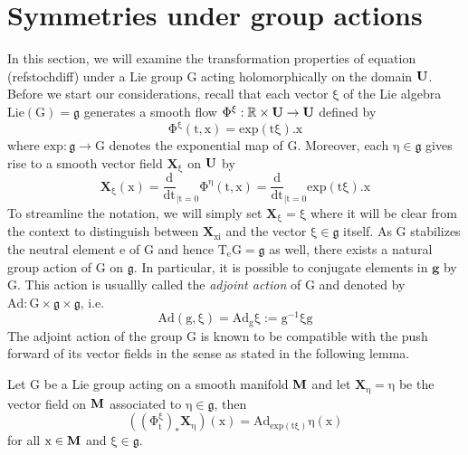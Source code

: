 \documentclass[10 pt,english]{smfart}
\newcommand{\G}{{\textrm{G}}}
\newcommand{\Xvec}{\mathrm{\mathbf{X}}}
\newcommand{\g}{\mathrm{\mathbf{g}}}
\newcommand{\U}{{\bf{U}}}
\newcommand{\M}{{\bf{M}}}
\begin{document}
\section{Symmetries under group actions}
In this section, we will examine the transformation properties of equation (ref{stochdiff}) under a Lie group $\mathrm{\G}$ acting holomorphically on the domain $\mathrm{\U}$. 
Before we start our considerations, recall that each vector $\mathrm{\xi}$ of the Lie algebra ${\mathrm{Lie}(\G)=\mathfrak{g}}$ generates a smooth flow $\mathrm{\Phi^{\xi}:\mathbb{R}\times\U\rightarrow\U}$
defined by 
\begin{equation}
\mathrm{\Phi^{\xi}(t,x)=exp(t \xi).x}
\end{equation} where $\mathrm{exp:\mathfrak{g}\rightarrow \G}$ denotes the exponential map of $\mathrm{\G}$. Moreover, each $\mathrm{\eta\in\mathfrak{g}}$ gives rise to a smooth vector field $\mathrm{\Xvec_{\xi}}$  on $\mathrm{\U}$ by 
\begin{equation}
\mathrm{\Xvec_{\xi}(x)=\frac{d}{dt}_{\vert t=0}\Phi^{\eta}(t,x)=\frac{d}{dt}_{\vert t=0}exp(t \xi).x}
\end{equation} To streamline the notation, we will simply set $\mathrm{\Xvec_{\xi}=\xi}$ where it will be clear from the context to distinguish between $\mathrm{\Xvec_{xi}}$ and the vector $\mathrm{\xi\in\mathfrak{g}}$
itself. As $\mathrm{\G}$ stabilizes the neutral element $\mathrm{e}$ of $\mathrm{\G}$ and hence $\mathrm{T_{e}\G=\mathfrak{g}}$ as well, there exists a natural group action of $\mathrm{\G}$
on $\mathrm{\mathfrak{g}}$. In particular, it is possible to conjugate elements in $\mathfrak{\g}$ by $\mathrm{\G}$. This action is usuallly called the \textit{adjoint action} of $\mathrm{\G}$ and denoted by 
$\mathrm{Ad:\G\times\mathfrak{g}\times\mathfrak{g}}$, i.e.
\begin{equation}
\mathrm{Ad(g,\xi)=Ad_{g}\xi:=g^{-1}\xi g}
\end{equation}
The adjoint action of the group $\mathrm{\G}$ is known to be compatible with the push forward of its vector fields in the sense as stated in the following lemma.
\begin{lemm}\label{adjointaction} Let $\mathrm{\G}$ be a Lie group acting on a smooth manifold $\mathrm{\M}$ and let $\mathrm{\Xvec_{\eta}=\eta}$ be the vector field on $\mathrm{\M}$ associated to $\mathrm{\eta\in\mathfrak{g}}$, then 
\begin{equation}
\mathrm{\left(\left(\Phi^{\xi}_{t}\right)_{*}\Xvec_{\eta}\right)(x)=Ad_{exp(t \xi)}\eta(x)}
\end{equation} for all $\mathrm{x\in\M}$ and $\mathrm{\xi\in\mathfrak{g}}$.
\end{lemm}
\end{document}
